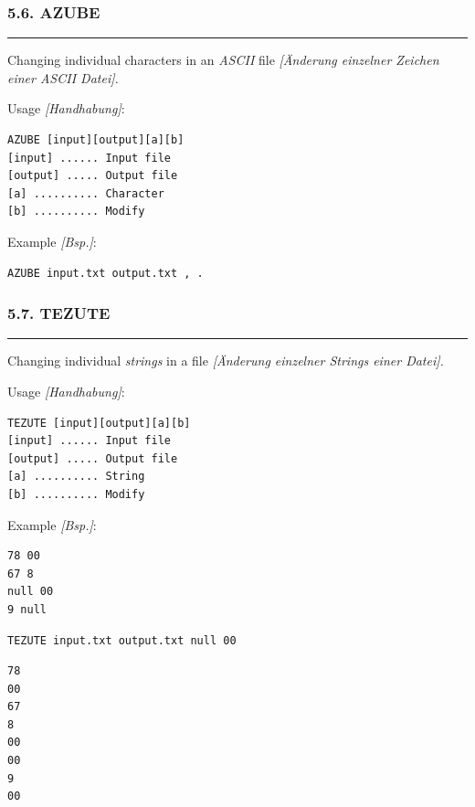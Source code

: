 \documentclass[
]{article}
\begin{document}
\hypertarget{azube}{%
\subsubsection{5.6. AZUBE}\label{azube}}

\begin{center}\rule{0.5\linewidth}{0.5pt}\end{center}

Changing individual characters in an \emph{ASCII} file \emph{{[}Änderung
einzelner Zeichen einer ASCII Datei{]}.}

Usage \emph{{[}Handhabung{]}}:

\begin{verbatim}
AZUBE [input][output][a][b] 
[input] ...... Input file
[output] ..... Output file
[a] .......... Character
[b] .......... Modify 
\end{verbatim}

Example \emph{{[}Bsp.{]}}:

\begin{verbatim}
AZUBE input.txt output.txt , .
\end{verbatim}

\hypertarget{tezute}{%
\subsubsection{5.7. TEZUTE}\label{tezute}}

\begin{center}\rule{0.5\linewidth}{0.5pt}\end{center}

Changing individual \emph{strings} in a file \emph{{[}Änderung einzelner
Strings einer Datei{]}.}

Usage \emph{{[}Handhabung{]}}:

\begin{verbatim}
TEZUTE [input][output][a][b] 
[input] ...... Input file
[output] ..... Output file 
[a] .......... String
[b] .......... Modify 
\end{verbatim}

Example \emph{{[}Bsp.{]}}:

\begin{verbatim}
78 00
67 8
null 00
9 null
\end{verbatim}

\begin{verbatim}
TEZUTE input.txt output.txt null 00
\end{verbatim}

\begin{verbatim}
78
00
67
8
00
00
9
00
\end{verbatim}
\end{document}
